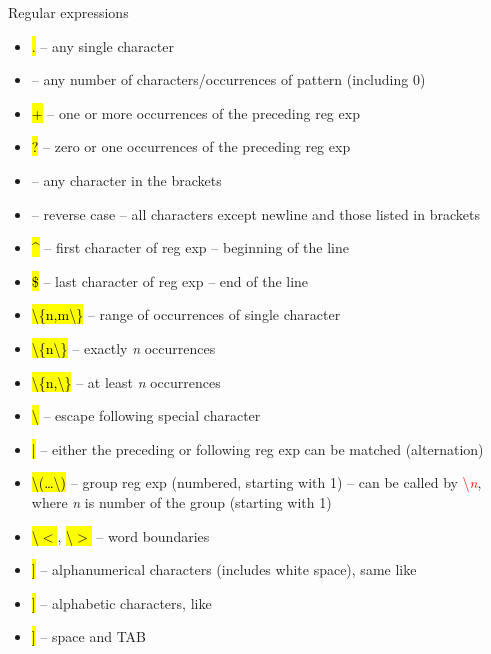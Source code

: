\documentclass[compress, ucs, xelatex, 11pt, xcolor=svgnames,
  hyperref={
    bookmarks=true,
    unicode=true,
    colorlinks=true,
    pdftitle={Linux, command line and MetaCentrum},
    plainpages=false,
    pdfauthor={Vojtech Zeisek},
    pdfsubject={Course about use of Linux command line, writing shell scripts and using MetaCentrum of CESNET},
    pdfcreator={XeLaTeX},
    pdfkeywords={Linux, GNU, BASH, shell, command line, MetaCentrum},
    linkcolor=DarkRed,
    anchorcolor=DarkBlue,
    citecolor=Indigo,
    filecolor=NavyBlue,
    menucolor=DarkMagenta,
    urlcolor=DarkBlue,
    pdftex},
  url={hyphens, lowtilde} %
  ]{beamer}
\renewcommand{\texttt}[1]{\hl{\ttfamily #1}}
\renewcommand{\alert}[1]{\textcolor{red}{#1}}
\begin{document}
\begin{frame}[allowframebreaks]{Regular expressions}
  \label{regexp}
  \begin{itemize}
    \item \alert{\texttt{.}} -- any single character
    \item \alert{\texttt{*}} -- any number of characters/occurrences of pattern (including 0)
    \item \alert{\texttt{+}} -- one or more occurrences of the preceding reg exp
    \item \alert{\texttt{?}} -- zero or one occurrences of the preceding reg exp
    \item \alert{\texttt{[\ldots]}} -- any character in the brackets
    \item \alert{\texttt{[\textasciicircum\ldots]}} -- reverse case -- all characters except newline and those listed in brackets
    \item \alert{\texttt{\textasciicircum}} -- first character of reg exp -- beginning of the line
    \item \alert{\texttt{\$}} -- last character of reg exp -- end of the line
    \item \alert{\texttt{\textbackslash\{n,m\textbackslash\}}} -- range of occurrences of single character
    \item \alert{\texttt{\textbackslash\{n\textbackslash\}}} -- exactly \textit{n} occurrences
    \item \alert{\texttt{\textbackslash\{n,\textbackslash\}}} -- at least \textit{n} occurrences
    \item \alert{\texttt{\textbackslash}} -- escape following special character
    \item \alert{\texttt{|}} -- either the preceding or following reg exp can be matched (alternation)
    \item \alert{\texttt{\textbackslash(\ldots\textbackslash)}} -- group reg exp (numbered, starting with 1) -- can be called by \alert{\textbackslash\textit{n}}, where \textit{n} is number of the group (starting with 1)
    \item \alert{\texttt{\textbackslash$<$}}, \alert{\texttt{\textbackslash$>$}} -- word boundaries
    \item \alert{\texttt{[[:alnum:]]}} -- alphanumerical characters (includes white space), same like \alert{\texttt{[a-zA-Z0-9]}}
    \item \alert{\texttt{[[:alpha:]]}} -- alphabetic characters, like \alert{\texttt{[a-zA-Z]}}
    \item \alert{\texttt{[[:blank:]]}} -- space and TAB

\end{itemize}
\end{frame}
\end{document}
